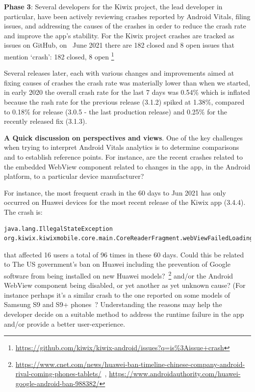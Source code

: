\textbf{Phase 3}: Several developers for the Kiwix project, the lead developer in particular, have been actively reviewing crashes reported by Android Vitals, filing issues, and addressing the causes of the crashes in order to reduce the crash rate and improve the app's stability. For the Kiwix project crashes are tracked as issues on GitHub, on~ June 2021 there are 182 closed and 8 open issues that mention `crash': 182 closed, 8 open %
\footnote{\url{https://github.com/kiwix/kiwix-android/issues?q=is\%3Aissue+crash}}

Several releases later, each with various changes and improvements aimed at fixing causes of crashes the crash rate was materially lower than when we started, in early 2020 the overall crash rate for the last 7 days was 0.54\% which is inflated because the rash rate for the previous release (3.1.2) spiked at 1.38\%, compared to 0.18\% for release (3.0.5 -  the last production release) and 0.25\% for the recently released fix (3.1.3).


\textbf{A Quick discussion on perspectives and views}. 
One of the key challenges when trying to interpret Android Vitals analytics is to determine comparisons and to establish reference points. For instance, are the recent crashes related to the embedded WebView component related to changes in the app, in the Android platform, to a particular device manufacturer? 

For instance, the most frequent crash in the 60 days to  Jun 2021 has only occurred on Huawei devices for the most recent release of the Kiwix app (3.4.4). The crash is:

\begin{lstlisting}
java.lang.IllegalStateException
org.kiwix.kiwixmobile.core.main.CoreReaderFragment.webViewFailedLoading
\end{lstlisting}

that affected 16 users a total of 96 times in these 60 days. %
Could this be related to The US government's ban on Huawei including the prevention of Google software from being installed on new Huawei models?~\footnote{\url{https://www.cnet.com/news/huawei-ban-timeline-chinese-company-android-rival-coming-phones-tablets/}~\citep{androidauthority2021_the_huawei_ban}, \url{https://www.androidauthority.com/huawei-google-android-ban-988382/}} and/or the Android WebView component being disabled, or yet another as yet unknown cause? (For instance perhaps it's a similar crash to the one reported on some models of Samsung S9 and S9+ phones~\citep{ebling2018_so_s9_specific_webview_device_crash_report}? Understanding the reasons may help the developer decide on a suitable method to address the runtime failure in the app and/or provide a better user-experience.

